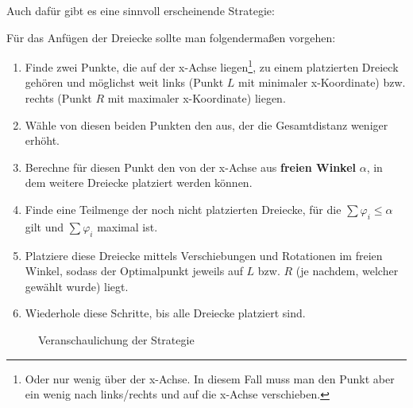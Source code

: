 \documentclass[a4paper, notitlepage, 12pt,headinclude]{scrartcl}
\begin{document}
Auch dafür gibt es eine sinnvoll erscheinende Strategie:
\begin{kasten}
	Für das Anfügen der Dreiecke sollte man folgendermaßen vorgehen:
	\begin{enumerate}
		\item Finde zwei Punkte, die auf der x-Achse liegen\footnote{Oder nur wenig über der x-Achse. In diesem Fall muss man den Punkt aber ein wenig nach links/rechts und auf die x-Achse verschieben.}, zu einem platzierten Dreieck gehören und möglichst weit links (Punkt $L$ mit minimaler x-Koordinate) bzw. rechts (Punkt $R$ mit maximaler x-Koordinate) liegen.
		\item Wähle von diesen beiden Punkten den aus, der die Gesamtdistanz weniger erhöht.
		\item Berechne für diesen Punkt den von der x-Achse aus \textbf{freien Winkel} $\alpha$, in dem weitere Dreiecke platziert werden können.
		\item Finde eine Teilmenge der noch nicht platzierten Dreiecke, für die $\sum \varphi_i \leq \alpha$ gilt und $\sum \varphi_i$ maximal ist. 
		\item Platziere diese Dreiecke mittels Verschiebungen und Rotationen im freien Winkel, sodass der Optimalpunkt jeweils auf $L$ bzw. $R$ (je nachdem, welcher gewählt wurde) liegt.
		\item Wiederhole diese Schritte, bis alle Dreiecke platziert sind.
	\end{enumerate}
\end{kasten}
\begin{figure}[H]
	\centering {}
	\caption{Veranschaulichung der Strategie}
\end{figure}
\end{document}
